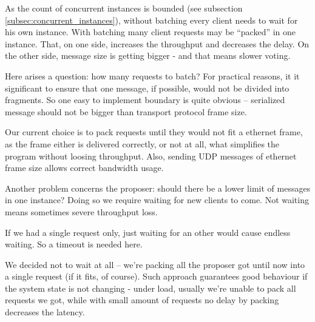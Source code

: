 As the count of concurrent instances is bounded (see subsection \ref{subsec:concurrent_instances}), without batching every client needs to wait for his own instance. With batching many client requests may be ``packed'' in one instance. That, on one side, increases the throughput and decreases the delay.
On the other side, message size is getting bigger - and that means slower voting.

Here arises a question: how many requests to batch? For practical reasons, it it significant to ensure that one message, if possible, would not be divided into fragments. So one easy to implement boundary is quite obvious -- serialized message should not be bigger than transport protocol frame size.

Our current choice is to pack requests until they would not fit a ethernet frame, as the frame either is delivered correctly, or not at all, what simplifies the program without loosing throughput. Also, sending UDP messages of ethernet frame size allows correct bandwidth usage.

Another problem concerns the proposer: should there be a lower limit of messages in one instance? Doing so we require waiting for new clients to come. Not waiting means sometimes severe throughput loss.

If we had a single request only, just waiting for an other would cause endless waiting. So a timeout is needed here.

We decided not to wait at all -- we're packing all the proposer got until now into a single request (if it fits, of course). Such approach guarantees good behaviour if the system state is not changing - under load, usually we're unable to pack all requests we got, while with small amount of requests no delay by packing decreases the latency.
